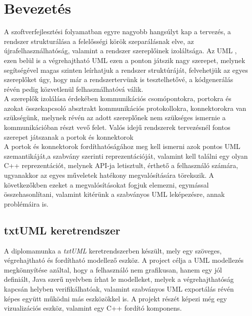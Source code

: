 \documentclass[a4paper,12pt]{report}
\begin{document}

\cleardoublepage

\tableofcontents

\chapter{Bevezetés}
A szoftverfejlesztési folyamatban egyre nagyobb hangsúlyt kap a tervezés, a rendszer strukturálása a felelősségi körök szeparálásnak elve, az újrafelhasználhatóság, valamint a rendszer szereplőinek izoláltsága. Az UML \cite{uml_omg}, ezen belül is a végrehajtható UML ezen a ponton játszik nagy szerepet, melynek segítségével magas szinten leírhatjuk a rendszer struktúráját, felvehetjük az egyes szereplőket úgy, hogy már a rendszertervünk is tesztelhetővé, a kódgenerálás révén pedig közvetlenül felhasználhatóvá válik. \\ A szereplők izolálása érdekében kommunikációs csomópontokra, portokra és azokat összekapcsoló absztrakt kommunikációs protokollokra, konnektorokra van szükségünk, melynek révén az adott szereplőnek nem szükséges ismernie a kommunikációban részt vevő felet. Valós idejű rendszerek tervezésnél fontos szerepet játszanak a portok és konnektorok \cite{uml_real}\\ 
A portok és konnektorok fordíthatóságához meg kell ismerni azok pontos UML szemantikáját,a szabvány szerinti reprezentációját, valamint kell találni egy olyan C++ reprezentációt, melynek API-ja letisztult, érthető a felhasználó számára, ugyanakkor az egyes műveletek hatékony megvalósítására törekszik. A következőkben ezeket a megvalósításokat fogjuk elemezni, egymással összehasonlítani, valamint kitérünk a szabványos UML leképezésre, annak problémáira is. \\

\section{txtUML keretrendszer}
A diplomamunka a \textit{txtUML} keretrendszerben készült, mely egy szöveges, végrehajtható és fordítható modellező eszköz. A project célja a UML modellezés megkönnyítése azáltal, hogy a felhasználó nem grafikusan, hanem egy jól definiált, Java szerű nyelvben írhat le modelleket, melyek a végrehajthatóság kapcsán helyben verifikálhatóak, valamint szabványos UML exportálás révén képes együtt működni más eszközökkel is. A projekt részét képezi még egy vizualizációs eszköz, valamint egy C++ fordító komponens.\\
\end{document}
